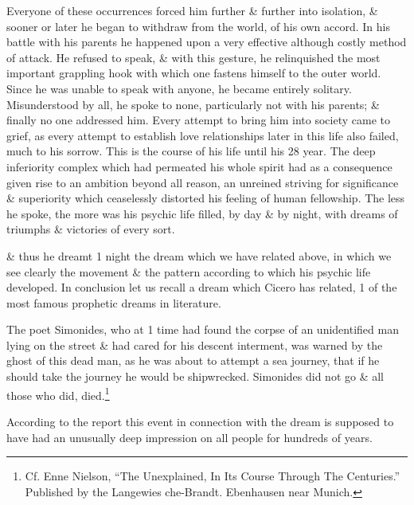 \documentclass{article}
\begin{document}
Everyone of these occurrences forced him further \& further into isolation, \& sooner or later he began to withdraw from the world, of his own accord. In his battle with his parents he happened upon a very effective although costly method of attack. He refused to speak, \& with this gesture, he relinquished the most important grappling hook with which one fastens himself to the outer world. Since he was unable to speak with anyone, he became entirely solitary. Misunderstood by all, he spoke to none, particularly not with his parents; \& finally no one addressed him. Every attempt to bring him into society came to grief, as every attempt to establish love relationships later in this life also failed, much to his sorrow. This is the course of his life until his 28 year. The deep inferiority complex which had permeated his whole spirit had as a consequence given rise to an ambition beyond all reason, an unreined striving for significance \& superiority which ceaselessly distorted his feeling of human fellowship. The less he spoke, the more was his psychic life filled, by day \& by night, with dreams of triumphs \& victories of every sort.

\& thus he dreamt 1 night the dream which we have related above, in which we see clearly the movement \& the pattern according to which his psychic life developed. In conclusion let us recall a dream which Cicero has related, 1 of the most famous prophetic dreams in literature.

The poet Simonides, who at 1 time had found the corpse of an unidentified man lying on the street \& had cared for his descent interment, was warned by the ghost of this dead man, as he was about to attempt a sea journey, that if he should take the journey he would be shipwrecked. Simonides did not go \& all those who did, died.\footnote{Cf. Enne Nielson, ``The Unexplained, In Its Course Through The Centuries.'' Published by the Langewies che-Brandt. Ebenhausen near Munich.}

According to the report this event in connection with the dream is supposed to have had an unusually deep impression on all people for hundreds of years.
\end{document}
